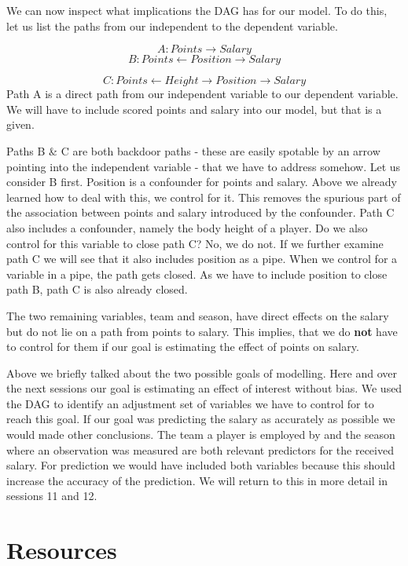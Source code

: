 \documentclass[
]{book}
\begin{document}
We can now inspect what implications the DAG has for our model. To do this,
let us list the paths from our independent to the dependent variable.

\[A: Points \rightarrow Salary\]
\[B: Points \leftarrow Position \rightarrow Salary\]

\[C: Points \leftarrow Height \rightarrow Position \rightarrow Salary\]
Path A is a direct path from our independent variable to our dependent variable.
We will have to include scored points and salary into our model, but that is a
given.

Paths B \& C are both backdoor paths - these are easily spotable by an arrow
pointing into the independent variable - that we have to address somehow.
Let us consider B first. Position is a confounder for points and salary. Above
we already learned how to deal with this, we control for it. This removes
the spurious part of the association between points and salary introduced by the
confounder. Path C also includes a confounder, namely the body height of a player.
Do we also control for this variable to close path C? No, we do not. If we
further examine path C we will see that it also includes position as a pipe.
When we control for a variable in a pipe, the path gets closed. As we have to
include position to close path B, path C is also already closed.

The two remaining variables, team and season, have direct effects on the
salary but do not lie on a path from points to salary. This implies, that we
do \textbf{not} have to control for them if our goal is estimating the effect of
points on salary.

Above we briefly talked about the two possible goals of modelling. Here and over
the next sessions our goal is estimating an effect of interest without bias. We
used the DAG to identify an adjustment set of variables we have to control for
to reach this goal.
If our goal was predicting the salary as accurately as possible we would made
other conclusions. The team a player is employed by and the season where an
observation was measured are both relevant predictors for the received salary.
For prediction we would have included both variables because this should increase
the accuracy of the prediction. We will return to this in more detail in
sessions 11 and 12.

\hypertarget{resources}{%
\section{Resources}\label{resources}}
\end{document}
